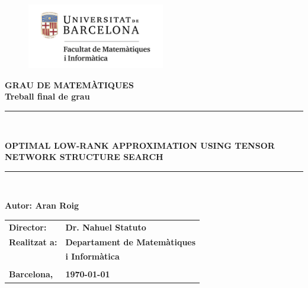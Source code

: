 \documentclass[11pt,a4paper,openright,oneside]{book}
\numberwithin{equation}{section}
\begin{document}

\thispagestyle{empty}

\begin{titlepage}
\begin{center}
\begin{figure}[htb]
\begin{center}
\includegraphics[width=6cm]{matematiquesinformatica-pos-rgb.png}
\end{center}
\end{figure}

\vspace*{1cm}
\textbf{\LARGE GRAU DE MATEM\`{A}TIQUES } \\
\vspace*{.5cm}
\textbf{\LARGE Treball final de grau} \\

\vspace*{1.5cm}
\rule{16cm}{0.1mm}\\
\begin{Huge}
\textbf{OPTIMAL LOW-RANK APPROXIMATION USING TENSOR NETWORK STRUCTURE SEARCH} \\
\end{Huge}
\rule{16cm}{0.1mm}\\

\vspace{1cm}

\begin{flushright}
\textbf{\LARGE Autor: Aran Roig}

\vspace*{2cm}

\renewcommand{\arraystretch}{1.5}
\begin{tabular}{ll}
\textbf{\Large Director:} & \textbf{\Large Dr. Nahuel Statuto} \\
\textbf{\Large Realitzat a:} & \textbf{\Large  Departament de Matemàtiques   } \\
 & \textbf{\Large i Informàtica} \\
\\
\textbf{\Large Barcelona,} & \textbf{\Large \today }
\end{tabular}

\end{flushright}

\end{center}



\end{titlepage}
\end{document}
